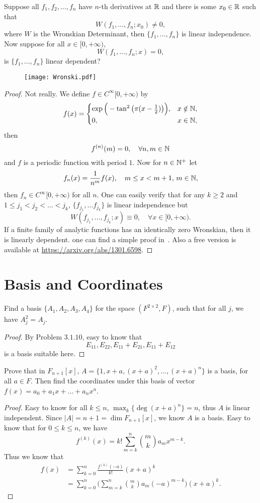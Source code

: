 \begin{pro}
	Suppose all $f_1,f_2,\dots,f_n$ have $n$-th derivatives at $\mathbb{R}$ and there is some $x_0\in \mathbb{R}$ such that 
	\[W(f_1,\dots,f_n;x_0)\neq 0,\]
	where $W$ is the Wronskian Determinant, then $\{f_1,\dots,f_n\}$ is linear independence. Now suppose for all $x\in[0,+\infty)$,
	\[W(f_1,\dots,f_n;x)=0,\]
	is $\{f_1,\dots,f_n\}$ linear dependent?
\end{pro}
\begin{figure}
	\centering
	\texttt{[image: Wronski.pdf]}
\end{figure}
\begin{proof}
	Not really. We define $f\in C^{\infty}[0,+\infty)$ by
	\[f(x)=
	\begin{cases}
		\exp\Big(-\tan^2\big(\pi(x-\frac{1}{2})\big)\Big), & x\notin \mathbb{N},\\
		0,& x\in \mathbb{N},
	\end{cases}
	\]  
	then
	\[f^{(n)}(m)=0,\quad \forall n,m\in \mathbb{N}\]
	and $f$ is a periodic function with period $1$. Now for $n\in\mathbb{N}^+$ let 
	\[f_n(x)=\frac{1}{n^m} f(x),\quad m\leq x<m+1,\, m\in\mathbb{N},\]
	then $f_n\in C^{\infty}[0,+\infty)$ for all $n$. One can easily verify that 
	for any $k\geq 2$ and $1\leq j_1<j_2<\dots<j_k$, $\{f_{j_1},\dots f_{j_k}\}$ is linear independence but
	\[W(f_{j_1},\dots,f_{j_k};x)\equiv 0,\quad \forall x\in [0,+\infty).\]
	If a finite family of analytic functions has an identically zero Wronskian, then it is linearly dependent. one can find a simple proof in~\cite{Wronskian2010}. Also a free version is available at \url{https://arxiv.org/abs/1301.6598}.
\end{proof}

\section{Basis and Coordinates}
\begin{pro}%
	Find a basis $\{A_1,A_2,A_3,A_4\}$ for the space $(F^{2\times 2},F)$, such that for all $j$, we have $A_j^2=A_j$.
\end{pro}
\begin{proof}
	By Problem $3.1.10$, easy to know that
	\[E_{11},E_{22},E_{11}+E_{21},E_{11}+E_{12}\]
	is a basis suitable here.
\end{proof}

\begin{pro}%
	Prove that in $F_{n+1}[x]$, $A=\{1,x+a,(x+a)^2,\dots, (x+a)^n\}$ is a basis, for all $a\in F$. Then find the coordinates under this basis of vector $f(x)=a_0+a_1x+\dots+a_n x^n$.
\end{pro}
\begin{proof}
	Easy to know for all $k\leq n$, $\max_k \{\deg (x+a)^n\}=n$, thus $A$ is linear independent. Since $|A|=n+1=\dim F_{n+1}[x]$, we know $A$ is a basis. Easy to know that for $0\leq k\leq n$, we have
	\[f^{(k)}(x)=k!\sum_{m=k}^n \binom{m}{k} a_m x^{m-k}.\]
	Thus we know that
	\begin{align*}
		f(x)&=\sum_{k=0}^n \frac{f^{(k)}(-a)}{k!} (x+a)^k\\
			&=\sum_{k=0}^n \bigg(\sum_{m=k}^n \binom{m}{k} a_m (-a)^{m-k}\bigg) (x+a)^k.
	\end{align*}
\end{proof}

